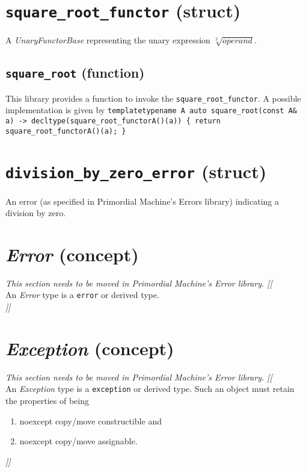 \documentclass[oneside]{book}
\begin{document}
\section{\texttt{square\_root\_functor} (struct)}
A \textit{UnaryFunctorBase} representing the unary expression $\sqrt[2]{operand}$.\newline

\subsection{\texttt{square\_root} (function)}
This library provides a function to invoke the \texttt{square\_root\_functor}.
A possible implementation is given by\newline
\texttt{template\textlangle typename A\textrangle\newline
auto square\_root(const A\& a) -> decltype(square\_root\_functor\textlangle A\textrangle()(a))\newline
\{ return square\_root\_functor\textlangle A\textrangle()(a); \}}

\section{\texttt{division\_by\_zero\_error} (struct)}
An error (as specified in Primordial Machine's Errors library) indicating a division by zero.

\section{\textit{Error} (concept)}
\textit{\color{orange}This section needs to be moved in Primordial Machine's Error library.}
\noindent\textit{\color{orange}[[}\\
An \textit{Error} type is a \texttt{error} or derived type.\\
\noindent\textit{\color{orange}]]}

\section{\textit{Exception} (concept)}
\textit{\color{orange}This section needs to be moved in Primordial Machine's Error library.}
\noindent\textit{\color{orange}[[}\\
An \textit{Exception} type is a \texttt{exception} or derived type.
Such an object must retain the properties of being
\begin{enumerate}
  \item noexcept copy/move constructible and
  \item noexcept copy/move assignable.
\end{enumerate}
\noindent\textit{\color{orange}]]}
\end{document}
